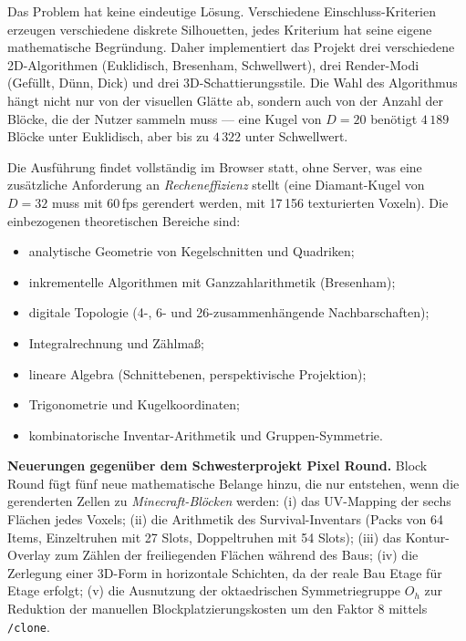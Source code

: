 \documentclass[12pt,a4paper]{scrartcl}
\newcommand{\cmd}[1]{\textcolor{earth}{\texttt{\small #1}}}
\begin{document}
Das Problem hat keine eindeutige Lösung. Verschiedene Einschluss-Kriterien erzeugen verschiedene diskrete Silhouetten, jedes Kriterium hat seine eigene mathematische Begründung. Daher implementiert das Projekt drei verschiedene 2D-Algorithmen (Euklidisch, Bresenham, Schwellwert), drei Render-Modi (Gefüllt, Dünn, Dick) und drei 3D-Schattierungsstile. Die Wahl des Algorithmus hängt nicht nur von der visuellen Glätte ab, sondern auch von der Anzahl der Blöcke, die der Nutzer sammeln muss --- eine Kugel von $D=20$ benötigt $4\,189$ Blöcke unter Euklidisch, aber bis zu $4\,322$ unter Schwellwert.

Die Ausführung findet vollständig im Browser statt, ohne Server, was eine zusätzliche Anforderung an \emph{Recheneffizienz} stellt (eine Diamant-Kugel von $D=32$ muss mit 60\,fps gerendert werden, mit 17\,156 texturierten Voxeln). Die einbezogenen theoretischen Bereiche sind:
\begin{itemize}[leftmargin=1.3em,itemsep=0.15em,topsep=0.3em]
  \item analytische Geometrie von Kegelschnitten und Quadriken;
  \item inkrementelle Algorithmen mit Ganzzahlarithmetik (Bresenham);
  \item digitale Topologie (4-, 6- und 26-zusammenhängende Nachbarschaften);
  \item Integralrechnung und Zählmaß;
  \item lineare Algebra (Schnittebenen, perspektivische Projektion);
  \item Trigonometrie und Kugelkoordinaten;
  \item kombinatorische Inventar-Arithmetik und Gruppen-Symmetrie.
\end{itemize}

\textbf{Neuerungen gegenüber dem Schwesterprojekt Pixel Round.} Block Round fügt fünf neue mathematische Belange hinzu, die nur entstehen, wenn die gerenderten Zellen zu \emph{Minecraft-Blöcken} werden: (i) das UV-Mapping der sechs Flächen jedes Voxels; (ii) die Arithmetik des Survival-Inventars (Packs von 64 Items, Einzeltruhen mit 27 Slots, Doppeltruhen mit 54 Slots); (iii) das Kontur-Overlay zum Zählen der freiliegenden Flächen während des Baus; (iv) die Zerlegung einer 3D-Form in horizontale Schichten, da der reale Bau Etage für Etage erfolgt; (v) die Ausnutzung der oktaedrischen Symmetriegruppe $O_h$ zur Reduktion der manuellen Blockplatzierungskosten um den Faktor $8$ mittels \cmd{/clone}.

\end{document}

